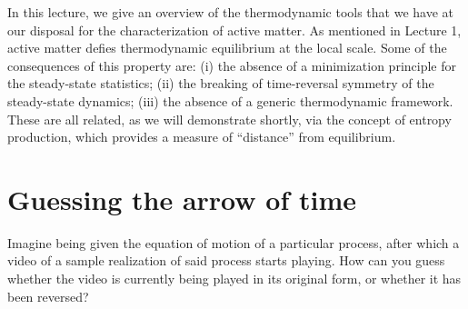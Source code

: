 In this lecture, we give an overview of the thermodynamic tools that we have at our disposal for the characterization of active matter. 
As mentioned in Lecture 1, active matter defies thermodynamic equilibrium at the local scale. Some of the consequences of this property are: (i) the absence of a minimization principle for the steady-state statistics; (ii) the breaking of time-reversal symmetry of the steady-state dynamics; (iii) the absence of a generic thermodynamic framework. These are all related, as we will demonstrate shortly, via the concept of entropy production, which provides a measure of ``distance'' from equilibrium.


\section{Guessing the arrow of time}

Imagine being given the equation of motion of a particular process, after which a video of a sample realization of said process starts playing. How can you guess whether the video is currently being played in its original form, or whether it has been reversed?

